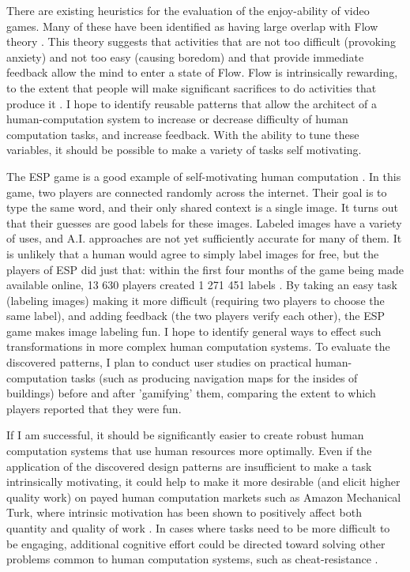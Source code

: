 \documentclass{article}
\begin{document}
There are existing heuristics for the evaluation of the enjoy-ability of video games. Many of these have been identified as having large overlap with Flow theory \cite{sweetser2005gameflow}. This theory suggests that activities that are not too difficult (provoking anxiety) and not too easy (causing boredom) and that provide immediate feedback allow the mind to enter a state of Flow. Flow is intrinsically rewarding, to the extent that people will make significant sacrifices to do activities that produce it \cite{csikszent1991flow}. I hope to identify reusable patterns that allow the architect of a human-computation system to increase or decrease difficulty of human computation tasks, and increase feedback. With the ability to tune these variables, it should be possible to make a variety of tasks self motivating.

The ESP game is a good example of self-motivating human computation \cite{von2009human}. In this game, two players are connected randomly across the internet. Their goal is to type the same word, and their only shared context is a single image. It turns out that their guesses are good labels for these images. Labeled images have a variety of uses, and A.I. approaches are not yet sufficiently accurate for many of them. It is unlikely that a human would agree to simply label images for free, but the players of ESP did just that: within the first four months of the game being made available online, 13 630 players created 1 271 451 labels \cite{von2009human}. By taking an easy task (labeling images) making it more difficult (requiring two players to choose the same label), and adding feedback (the two players verify each other), the ESP game makes image labeling fun. 
I hope to identify general ways to effect such transformations in more complex human computation systems. To evaluate the discovered patterns, I plan to conduct user studies on practical human-computation tasks (such as producing navigation maps for the insides of buildings) before and after 'gamifying' them, comparing the extent to which players reported that they were fun.

If I am successful, it should be significantly easier to create robust human computation systems that use human resources more optimally. Even if the application of the discovered design patterns are insufficient to make a task intrinsically motivating, it could help to make it more desirable (and elicit higher quality work) on payed human computation markets such as Amazon Mechanical Turk, where intrinsic motivation has been shown to positively affect both quantity and quality of work \cite{Chandler2013123}. In cases where tasks need to be more difficult to be engaging, additional cognitive effort could be directed toward solving other problems common to human computation systems, such as cheat-resistance \cite{Quinn:2011:HCS:1978942.1979148}.




\newpage

{}

\end{document}
